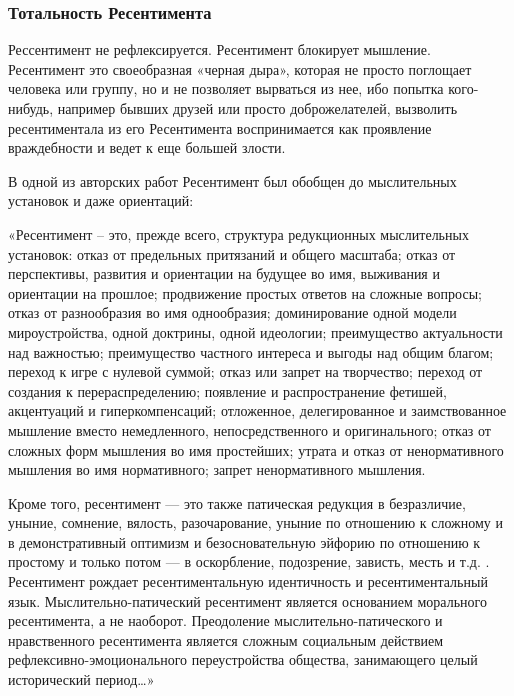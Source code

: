  
 
 
 
 

\subsubsection{Тотальность Ресентимента}

Рессентимент не рефлексируется. Ресентимент блокирует мышление. Ресентимент это
своеобразная «черная дыра», которая не просто поглощает человека или группу, но
и не позволяет вырваться из нее, ибо попытка кого-нибудь, например бывших
друзей или просто доброжелателей, вызволить ресентиментала из его Ресентимента
воспринимается как проявление враждебности и ведет к еще большей злости.

В одной из авторских работ Ресентимент был обобщен до мыслительных установок и
даже ориентаций:

«Ресентимент – это, прежде всего, структура редукционных мыслительных
установок: отказ от предельных притязаний и общего масштаба; отказ от
перспективы, развития и ориентации на будущее во имя, выживания и ориентации на
прошлое; продвижение простых ответов на сложные вопросы; отказ от разнообразия
во имя однообразия; доминирование одной модели мироустройства, одной доктрины,
одной идеологии; преимущество актуальности над важностью; преимущество частного
интереса и выгоды над общим благом; переход к игре с нулевой суммой; отказ или
запрет на творчество; переход от создания к перераспределению; появление и
распространение фетишей, акцентуаций и гиперкомпенсаций; отложенное,
делегированное и заимствованное мышление вместо немедленного, непосредственного
и оригинального; отказ от сложных форм мышления во имя простейших; утрата и
отказ от ненормативного мышления во имя нормативного; запрет ненормативного
мышления.

Кроме того, ресентимент — это также патическая редукция в безразличие, уныние,
сомнение, вялость, разочарование, уныние по отношению к сложному и в
демонстративный оптимизм и безосновательную эйфорию по отношению к простому и
только потом — в оскорбление, подозрение, зависть, месть и т.д. . Ресентимент
рождает ресентиментальную идентичность и ресентиментальный язык.
Мыслительно-патический ресентимент является основанием морального ресентимента,
а не наоборот. Преодоление мыслительно-патического и нравственного ресентимента
является сложным социальным действием рефлексивно-эмоционального переустройства
общества, занимающего целый исторический период…»

